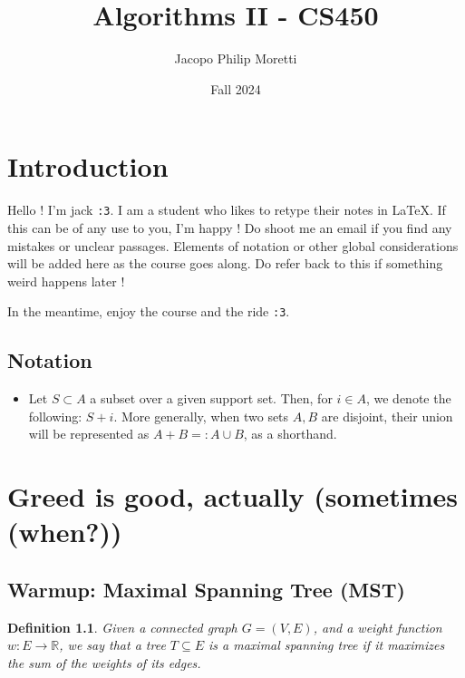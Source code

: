 \documentclass{report}
\title{Algorithms II - CS450}       %
\author{Jacopo Philip Moretti}      %
\date{Fall 2024}                    %
\newcommand{\RR}{\ensuremath{\mathbb{R}}}
\newtheorem{definition}{Definition}
\begin{document}
  \maketitle

  \chapter*{Introduction}

  Hello ! I'm jack \texttt{:3}. I am a student who likes to retype their notes in LaTeX. If this can be of any use to you, I'm happy ! Do shoot me an email if you find any mistakes or unclear passages. Elements of notation or other global considerations will be added here as the course goes along. Do refer back to this if something weird happens later !

  In the meantime, enjoy the course and the ride \texttt{:3}.

  \section*{Notation}
  \begin{itemize}
    \item Let $S \subset A$ a subset over a given support set. Then, for $i \in A$, we denote the following: $S + i$. More generally, when two sets $A, B$ are disjoint, their union will be represented as $A + B =: A \cup B$, as a shorthand.
  \end{itemize}

  \pagebreak

  \tableofcontents

  \pagebreak

  \chapter{Greed is good, actually (sometimes (when?))}


  \section{Warmup: Maximal Spanning Tree (MST)}

  \begin{definition}
    Given a connected graph $G = (V, E)$, and a weight function $w: E \to \RR$, we say that a tree $T \subseteq E$ is a \emph{maximal spanning tree} if it maximizes the sum of the weights of its edges.
  \end{definition}
\end{document}
